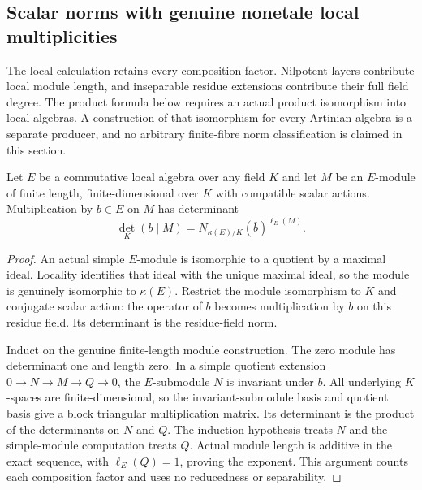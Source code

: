 \subsection{Scalar norms with genuine nonetale local multiplicities}
\label{subsec:local-algebra-norms}

The local calculation retains every composition factor. Nilpotent layers
contribute local module length, and inseparable residue extensions contribute
their full field degree. The product formula below requires an actual product
isomorphism into local algebras. A construction of that isomorphism for every
Artinian algebra is a separate producer, and no arbitrary finite-fibre norm
classification is claimed in this section.

\begin{theorem}
\label{spectrum:local-module-determinant}
\leanok
{}
Let $E$ be a commutative local algebra over any field $K$ and let $M$
be an $E$-module of finite length, finite-dimensional over $K$ with compatible
scalar actions. Multiplication by $b\in E$ on $M$ has determinant
\[
 \det_K(b\mid M)=N_{\kappa(E)/K}(\overline b)^{\ell_E(M)}.
\]
\end{theorem}
\begin{proof}
An actual simple $E$-module is isomorphic to a quotient by a maximal ideal.
Locality identifies that ideal with the unique maximal ideal, so the module
is genuinely isomorphic to $\kappa(E)$. Restrict the module isomorphism to
$K$ and conjugate scalar action: the operator of $b$ becomes multiplication
by $\overline b$ on this residue field. Its determinant is the residue-field
norm.

Induct on the genuine finite-length module construction. The zero module
has determinant one and length zero. In a simple quotient extension
$0\to N\to M\to Q\to0$, the $E$-submodule $N$ is invariant under $b$.
All underlying $K$-spaces are finite-dimensional, so the invariant-submodule
basis and quotient basis give a block triangular multiplication matrix.
Its determinant is the product of the determinants on $N$ and $Q$.
The induction hypothesis treats $N$ and the simple-module computation treats
$Q$. Actual module length is additive in the exact sequence, with
$\ell_E(Q)=1$, proving the exponent. This argument counts each composition
factor and uses no reducedness or separability.
\end{proof}

